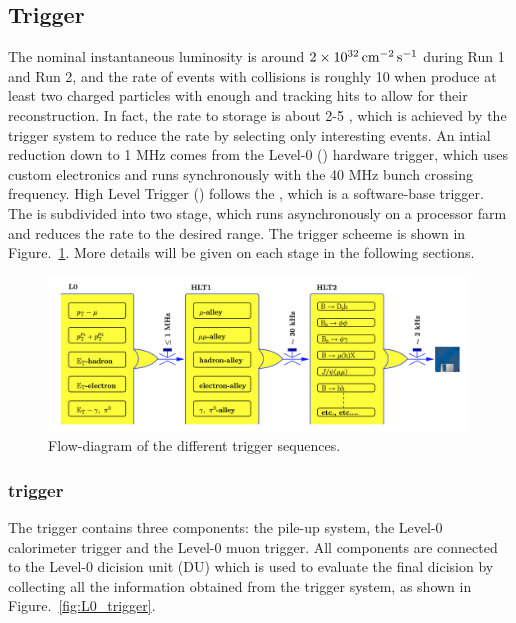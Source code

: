 

\subsection{Trigger}
\label{sec:trigger}

The nominal instantaneous luminosity is around $2\times10^{32}\text{\,cm}^{-2}\text{\,s}^{-1}$ during Run 1 and Run 2,  
and the rate of events with collisions is roughly 10 \mhz 
when produce at least two charged particles with enough \velo and tracking hits to allow for their reconstruction. 
In fact, 
the rate to storage is about 2-5 \khz,
which is achieved by the trigger system to reduce the rate by selecting only interesting events.
An intial reduction down to 1 MHz comes from the Level-0 (\lone) hardware trigger, 
which uses custom electronics and runs synchronously with the 40 MHz bunch crossing frequency. 
High Level Trigger (\hlt) follows the \lone,
which is a software-base trigger.
The \hlt is subdivided into two stage,
which runs asynchronously on a processor farm and reduces the rate to the desired range. 
The \lhcb trigger scheeme is shown in Figure.~\ref{fig:TRIGGER}.
More details will be given on each stage in the following sections.

\begin{figure}[!hbtp]
\centering
\includegraphics[width=0.99\textwidth]{Figures/02_Detector/TRIGGER}%
\caption{ Flow-diagram of the different trigger sequences\supercite{LHCb-DP-2008-001}.}
\label{fig:TRIGGER}
\end{figure}


\subsubsection{\lone trigger}

The \lone trigger contains three components:
the pile-up system,
the Level-0 calorimeter trigger and the Level-0 muon trigger.
All components are connected to the Level-0 dicision unit (DU) 
which is used to evaluate the final dicision by collecting all the information obtained from the trigger system,
as shown in Figure.~\ref{fig:L0_trigger}.

